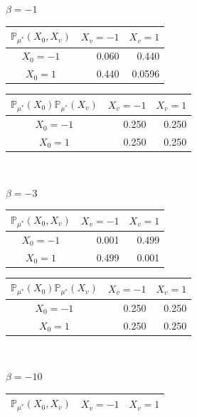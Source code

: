 \documentclass[12pt]{article}
\begin{document}
\begin{table}[h]
    \raggedright
    $\beta=-1$\\
    \centering
    \begin{tabular}{c|rr}
        $\mathbb{P}_{\mu^*}(X_0, X_v)$ & \multicolumn{1}{c}{$X_v=-1$} & \multicolumn{1}{c}{$X_v=1$} \\ \hline
        $X_0=-1$                       & 0.060                        & 0.440                       \\
        $X_0=1$                        & 0.440                        & 0.0596
    \end{tabular}
    \quad\quad
    \begin{tabular}{c|rr}
        $\mathbb{P}_{\mu^*}(X_0)\mathbb{P}_{\mu^*}(X_v)$ & \multicolumn{1}{c}{$X_v=-1$} & \multicolumn{1}{c}{$X_v=1$} \\ \hline
        $X_0=-1$                                         & 0.250                        & 0.250                       \\
        $X_0=1$                                          & 0.250                        & 0.250
    \end{tabular} \\
    \raggedright
    $\beta=-3$\\
    \centering
    \begin{tabular}{c|rr}
        $\mathbb{P}_{\mu^*}(X_0, X_v)$ & \multicolumn{1}{c}{$X_v=-1$} & \multicolumn{1}{c}{$X_v=1$} \\ \hline
        $X_0=-1$                       & 0.001                        & 0.499                       \\
        $X_0=1$                        & 0.499                        & 0.001
    \end{tabular}
    \quad\quad
    \begin{tabular}{c|rr}
        $\mathbb{P}_{\mu^*}(X_0)\mathbb{P}_{\mu^*}(X_v)$ & \multicolumn{1}{c}{$X_v=-1$} & \multicolumn{1}{c}{$X_v=1$} \\ \hline
        $X_0=-1$                                         & 0.250                        & 0.250                       \\
        $X_0=1$                                          & 0.250                        & 0.250
    \end{tabular} \\
    \raggedright
    $\beta=-10$\\
    \centering
    \begin{tabular}{c|rr}
        $\mathbb{P}_{\mu^*}(X_0, X_v)$ & \multicolumn{1}{c}{$X_v=-1$} & \multicolumn{1}{c}{$X_v=1$} \\ \hline

\end{tabular}
\end{table}
\end{document}
